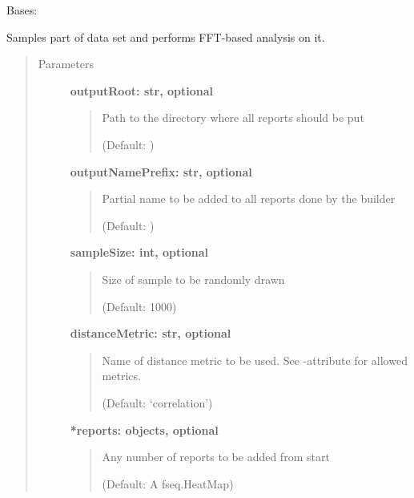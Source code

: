 \documentclass[letterpaper,10pt,english]{sphinxmanual}
\begin{document}
\begin{fulllineitems}
\label{fseq.reporting:fseq.reporting.report_builder.ReportBuilderFFT}
Bases: {\hyperref[fseq.reporting:fseq.reporting.report_builder.ReportBuilderBase]{}}

Samples part of data set and performs FFT-based analysis on it.
\begin{quote}\begin{description}
\item[{Parameters}] \leavevmode
\textbf{outputRoot: str, optional}
\begin{quote}

Path to the directory where all reports should be put

(Default: )
\end{quote}

\textbf{outputNamePrefix: str, optional}
\begin{quote}

Partial name to be added to all reports done by the builder

(Default: )
\end{quote}

\textbf{sampleSize: int, optional}
\begin{quote}

Size of sample to be randomly drawn

(Default: 1000)
\end{quote}

\textbf{distanceMetric: str, optional}
\begin{quote}

Name of distance metric to be used.
See -attribute for allowed metrics.

(Default: `correlation')
\end{quote}

\textbf{*reports: objects, optional}
\begin{quote}

Any number of reports to be added from start

(Default: A fseq.HeatMap)
\end{quote}

\end{description}\end{quote}




\end{fulllineitems}
\end{document}
